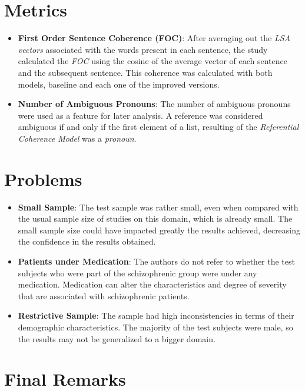 \documentclass{Paper_Summary}
\begin{document}
\section{Metrics}
    \begin{itemize}
        \item \textbf{First Order Sentence Coherence (FOC)}: After averaging out the \emph{LSA vectors} associated with the words present in each sentence, the study calculated the \emph{FOC} using the cosine of the average vector of each sentence and the subsequent sentence. This coherence was calculated with both models, baseline and each one of the improved versions.
        \item \textbf{Number of Ambiguous Pronouns}: The number of ambiguous pronouns were used as a feature for later analysis. A reference was considered ambiguous if and only if the first element of a list, resulting of the \emph{Referential Coherence Model} was a \emph{pronoun}.
    \end{itemize}

\section{Problems}
    \begin{itemize}
        \item \textbf{Small Sample}: The test sample was rather small, even when compared with the usual sample size of studies on this domain, which is already small. The small sample size could have impacted greatly the results achieved, decreasing the confidence in the results obtained.
        \item \textbf{Patients under Medication}: The authors do not refer to whether the test subjects who were part of the schizophrenic group were under any medication. Medication can alter the characteristics and degree of severity that are associated with schizophrenic patients.
        \item \textbf{Restrictive Sample}: The sample had high inconsistencies in terms of their demographic characteristics. The majority of the test subjects were male, so the results may not be generalized to a bigger domain.
    \end{itemize}


\section{Final Remarks}
\end{document}
